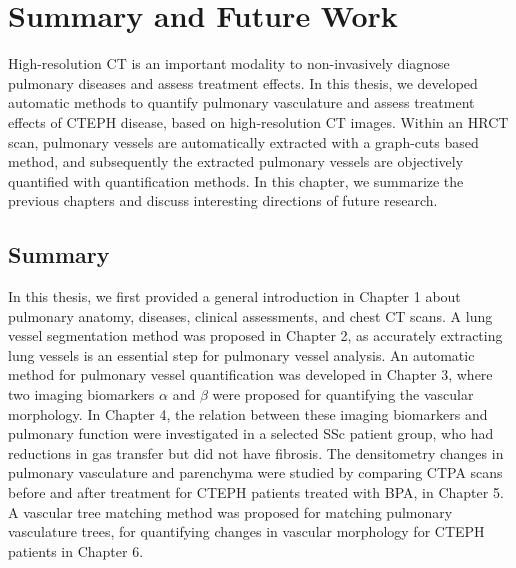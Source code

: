 \chapter{Summary and Future Work}\label{ch:summary}

\ThumbIndexShow


High-resolution CT is an important modality to non-invasively diagnose pulmonary diseases and assess treatment effects. In this thesis, we developed automatic methods to quantify pulmonary vasculature and assess treatment effects of CTEPH disease, based on high-resolution CT images. Within an HRCT scan, pulmonary vessels are automatically extracted with a graph-cuts based method, and subsequently the extracted pulmonary vessels are objectively quantified with quantification methods. In this chapter, we summarize the previous chapters and discuss interesting directions of future research.

\section{Summary}

In this thesis, we first provided a general introduction in Chapter 1 about pulmonary anatomy, diseases, clinical assessments, and chest CT scans. A lung vessel segmentation method was proposed in Chapter 2, as accurately extracting lung vessels is an essential step for pulmonary vessel analysis. An automatic method for pulmonary vessel quantification was developed in Chapter 3, where two imaging biomarkers $\alpha$ and $\beta$ were proposed for quantifying the vascular morphology. In Chapter 4, the relation between these imaging biomarkers and pulmonary function were investigated in a selected SSc patient group, who had reductions in gas transfer but did not have fibrosis. The densitometry changes in pulmonary vasculature and parenchyma were studied by comparing CTPA scans before and after treatment for CTEPH patients treated with BPA, in Chapter 5. A vascular tree matching method was proposed for matching pulmonary vasculature trees, for quantifying changes in vascular morphology for CTEPH patients in Chapter 6.  

